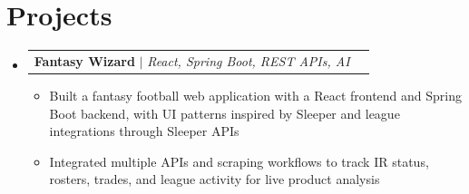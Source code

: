 \documentclass[letterpaper,11pt]{article}
\makeatletter
\newcommand{\resumeItem}[1]{
  \item\small{
    {#1 \vspace{-1pt}}
  }
}
\newcommand{\resumeProjectHeading}[2]{
    \item
    \begin{tabular*}{0.97\textwidth}{l@{\extracolsep{\fill}}r}
      \small#1 & #2 \\
    \end{tabular*}\vspace{-7pt}
}
\newcommand{\resumeSubHeadingListStart}{\begin{itemize}[leftmargin=0.15in, label={}]}
\newcommand{\resumeSubHeadingListEnd}{\end{itemize}}
\newcommand{\resumeItemListStart}{\begin{itemize}[leftmargin=0.18in,itemsep=1pt,topsep=2pt]}
\newcommand{\resumeItemListEnd}{\end{itemize}\vspace{-5pt}}
\makeatother
\begin{document}
%
\section{Projects}
    \resumeSubHeadingListStart
      \resumeProjectHeading
          {\textbf{Fantasy Wizard} $|$ \emph{React, Spring Boot, REST APIs, AI}}{}
          \resumeItemListStart
            \resumeItem{Built a fantasy football web application with a React frontend and Spring Boot backend, with UI patterns inspired by Sleeper and league integrations through Sleeper APIs}
            \resumeItem{Integrated multiple APIs and scraping workflows to track IR status, rosters, trades, and league activity for live product analysis}
          \resumeItemListEnd
    \resumeSubHeadingListEnd

\end{document}
